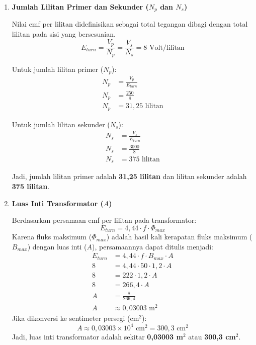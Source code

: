 \documentclass[12pt, a4paper]{article}
\begin{document}
\begin{enumerate}[label=\alph*.]
    \item \textbf{Jumlah Lilitan Primer dan Sekunder ($N_p$ dan $N_s$)}

    Nilai emf per lilitan didefinisikan sebagai total tegangan dibagi dengan total lilitan pada sisi yang bersesuaian.
    \[
        E_{turn} = \frac{V_p}{N_p} = \frac{V_s}{N_s} = 8 \text{ Volt/lilitan}
    \]

    Untuk jumlah lilitan primer ($N_p$):
    \begin{align*}
        N_p &= \frac{V_p}{E_{turn}} \\
        N_p &= \frac{250}{8} \\
        N_p &= 31,25 \text{ lilitan}
    \end{align*}

    Untuk jumlah lilitan sekunder ($N_s$):
    \begin{align*}
        N_s &= \frac{V_s}{E_{turn}} \\
        N_s &= \frac{3000}{8} \\
        N_s &= 375 \text{ lilitan}
    \end{align*}

    Jadi, jumlah lilitan primer adalah \textbf{31,25 lilitan} dan lilitan sekunder adalah \textbf{375 lilitan}.

    \item \textbf{Luas Inti Transformator ($A$)}

    Berdasarkan persamaan emf per lilitan pada transformator:
    \[
        E_{turn} = 4,44 \cdot f \cdot \Phi_{max}
    \]
    Karena fluks maksimum ($\Phi_{max}$) adalah hasil kali kerapatan fluks maksimum ($B_{max}$) dengan luas inti ($A$), persamaannya dapat ditulis menjadi:
    \begin{align*}
        E_{turn} &= 4,44 \cdot f \cdot B_{max} \cdot A \\
        8 &= 4,44 \cdot 50 \cdot 1,2 \cdot A \\
        8 &= 222 \cdot 1,2 \cdot A \\
        8 &= 266,4 \cdot A \\
        A &= \frac{8}{266,4} \\
        A &\approx 0,03003 \text{ m}^2
    \end{align*}
    Jika dikonversi ke sentimeter persegi ($\text{cm}^2$):
    \[
        A \approx 0,03003 \times 10^4 \text{ cm}^2 = 300,3 \text{ cm}^2
    \]
    Jadi, luas inti transformator adalah sekitar \textbf{0,03003 m$^2$} atau \textbf{300,3 cm$^2$}.
\end{enumerate}
\end{document}
